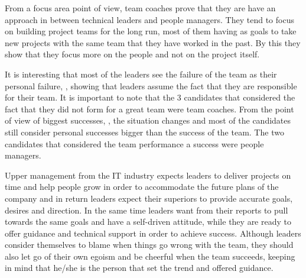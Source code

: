 From a focus area point of view, team coaches prove that they are have an approach in between technical leaders and people managers. They tend to focus on building project teams for the long run, most of them having as goals to take new projects with the same team that they have worked in the past. By this they show that they focus more on the people and not on the project itself.

It is interesting that most of the leaders see the failure of the team as their personal failure, , showing that leaders assume the fact that they are responsible for their team. It is important to note that the 3 candidates that considered the fact that they did not form for a great team were team coaches. From the point of view of biggest successes, , the situation changes and most of the candidates still consider personal successes bigger than the success of the team. The two candidates that considered the team performance a success were people managers.

Upper management from the IT industry expects leaders to deliver projects on time and help people grow in order to accommodate the future plans of the company and in return leaders expect their superiors to provide accurate goals, desires and direction. In the same time leaders want from their reports to pull towards the same goals and have a self-driven attitude, while they are ready to offer guidance and technical support in order to achieve success. Although leaders consider themselves to blame when things go wrong with the team, they should also let go of their own egoism and be cheerful when the team succeeds, keeping in mind that he/she is the person that set the trend and offered guidance. 